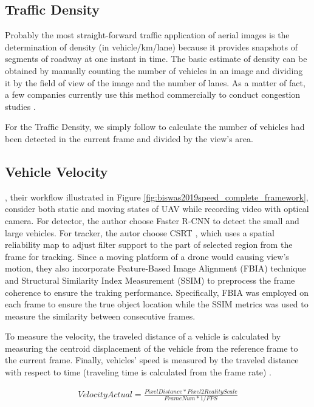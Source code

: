 \documentclass[10pt,twocolumn,letterpaper]{article}  %
\begin{document}
\subsection{Traffic Density}
Probably the most straight-forward traffic application of aerial images is the determination of density (in vehicle/km/lane) because it provides snapshots of segments of roadway at one instant in time. The basic estimate of density can be obtained by manually counting the number of vehicles in an image and dividing it by the field of view of the image and the number of lanes. As a matter of fact, a few companies currently use this method commercially to conduct congestion studies \cite{angel2003methods}.

For the Traffic Density, we simply follow \cite{angel2003methods} to calculate the number of vehicles had been detected in the current frame and divided by the view's area.



\subsection{Vehicle Velocity}

\cite{biswas2019speed}, their workflow illustrated in Figure \ref{fig:biswas2019speed_complete_framework}, consider both static and moving states of UAV while recording video with optical camera. For detector, the author choose Faster R-CNN \cite{ren2015faster} to detect the small and large vehicles. For tracker, the autor choose CSRT \cite{lunevzivc2018discriminative}, which uses a spatial reliability map to adjust filter support to the part of selected region from the frame for tracking. Since a moving platform of a drone would causing view's motion, they also incorporate Feature-Based Image Alignment (FBIA) technique and Structural Similarity Index Measurement (SSIM) to preprocess the frame coherence to ensure the traking performance. Specifically, FBIA was employed on each frame to ensure the true object location while the SSIM metrics was used to measure the similarity between consecutive frames.

To measure the velocity, the traveled distance of a vehicle is calculated by measuring the centroid displacement of the vehicle from the reference frame to the current frame. Finally, vehicles' speed is measured by the traveled distance with respect to time (traveling time is calculated from the frame rate) \cite{biswas2019speed}. 

\begin{equation}
	\label{eq:velocity-equation}
	\begin{aligned}
		VelocityActual = \frac{PixelDistance * Pixel2RealityScale}{FrameNum * 1/FPS}
	\end{aligned}
\end{equation}
\end{document}
